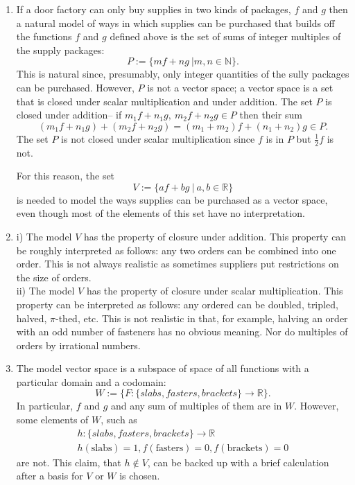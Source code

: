 \documentclass[12pt]{article}
\def\N{{\mathbb{N}}}
\begin{document}
\begin{enumerate}
\begin{enumerate}
\item 
If a door factory can only buy supplies in two kinds of packages, $f$ and $g$ then a natural model of ways in which supplies can be purchased that builds off the functions $f$ and $g$ defined above is the set of sums of integer multiples of the supply packages:
\[P:= \{ mf+ng~\vert m,n\in \N \}. \]
This is natural since, presumably, only integer quantities of the sully packages can be purchased.
However, $P$ is not a vector space; 
a vector space is a set that is closed under scalar multiplication and under addition. 
The set $P$ is  closed under addition-- if $m_1f+n_1g,~m_2f+n_2g \in P$ then their sum  
\[
(m_1f+n_1g)+(m_2f+n_2g)=  
(m_1+m_2)f+(n_1+n_2)g  
\in P.\]
The set $P$ is not closed under scalar multiplication since $f$ is in $P$ but $\frac12 f$ is not. 

For this reason, the set 
\[V:= \{ af+bg~\vert ~a,b\in \mathbb{R}\}\]
is needed to model the ways supplies can be purchased as a vector space, even though most of the elements of this set have no interpretation.

\item 
i) The model $V$ has the property of closure under addition. This property can be roughly interpreted as follows: any two orders can be combined into one order. This is not always realistic as sometimes suppliers put restrictions on the size of orders. 
\\
ii) The model $V$ has the property of closure under scalar multiplication. 
This property can be interpreted as follows: any ordered can be doubled, tripled, halved, $\pi$-thed, etc. This is not realistic in that, for example, halving an order with an odd number of  fasteners has no obvious meaning. Nor do  multiples of orders by irrational numbers. 


\item 
The model vector space is a subspace of space of all functions with a particular domain and a codomain:
\[ W:=\{  F: \{ slabs, fasters,brackets \} \to \mathbb{R}\}.\]
In particular, 
$f$ and $g$ and any sum of multiples of them are in $W$.
However, some elements of $W$, such as 
\begin{gather*}h:\{ slabs, fasters,brackets \} \to \mathbb{R}\\
 h(\text{slabs})=1,f(\text{fasters})=0, f(\text{brackets})= 0\end{gather*}
are not. This claim, that $h\notin V$, can be backed up with a brief calculation after a basis for $V$ or $W$ is chosen. 


\end{enumerate}
\end{enumerate}
\end{document}
